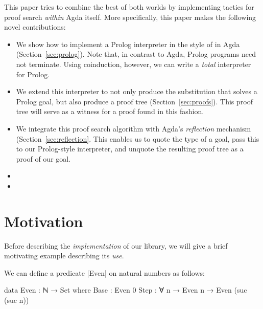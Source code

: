 \documentclass[preprint]{sigplanconf}
\begin{document}
This paper tries to combine the best of both worlds by implementing
tactics for proof search \emph{within} Agda itself. More specifically,
this paper makes the following novel contributions:

\begin{itemize}
\item
  We show how to implement a Prolog interpreter in the style of
  \citet{stutterheim} in Agda (Section~\ref{sec:prolog}). Note that,
  in contrast to Agda, Prolog programs need not terminate. Using coinduction,
  however, we can write a \emph{total} interpreter for Prolog.
\item
  We extend this interpreter to not only produce the substitution that
  solves a Prolog goal, but also produce a proof tree
  (Section~\ref{sec:proofs}). This proof tree will serve
  as a witness for a proof found in this fashion.
\item
  We integrate this proof search algorithm with Agda's \emph{reflection}
  mechanism (Section~\ref{sec:reflection}. This enables
  us to quote the type of a goal, pass this to our Prolog-style
  interpreter, and unquote the resulting proof tree as a proof of our
  goal.
\item
   
\item
\end{itemize}



\section{Motivation}
\label{sec:motivation}

Before describing the \emph{implementation} of our library, we will
give a brief motivating example describing its \emph{use}.

We can define a predicate |Even| on natural numbers as follows:

\begin{code}
  data Even : ℕ → Set where
    Base : Even 0
    Step : ∀ {n} → Even n → Even (suc (suc n))
\end{code}
\end{document}
